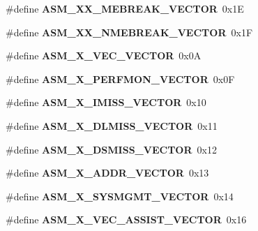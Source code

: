 \begin{DoxyCompactItemize}
\#define {\bfseries A\+S\+M\+\_\+X\+X\+\_\+\+M\+E\+B\+R\+E\+A\+K\+\_\+\+V\+E\+C\+T\+OR}~0x1E
\item 
\mbox{\label{group__ppc__exc_ga9d8d02f899858d8b6e101c22f6008d42}} 
\#define {\bfseries A\+S\+M\+\_\+X\+X\+\_\+\+N\+M\+E\+B\+R\+E\+A\+K\+\_\+\+V\+E\+C\+T\+OR}~0x1F
\item 
\mbox{\label{group__ppc__exc_ga285971eaed22cadd4094161af2421221}} 
\#define {\bfseries A\+S\+M\+\_\+X\+\_\+\+V\+E\+C\+\_\+\+V\+E\+C\+T\+OR}~0x0A
\item 
\mbox{\label{group__ppc__exc_ga71aca8f5d2cb0e7a828c468cc7557fcd}} 
\#define {\bfseries A\+S\+M\+\_\+X\+\_\+\+P\+E\+R\+F\+M\+O\+N\+\_\+\+V\+E\+C\+T\+OR}~0x0F
\item 
\mbox{\label{group__ppc__exc_gae9feb668d329032fccb52764ed84576b}} 
\#define {\bfseries A\+S\+M\+\_\+X\+\_\+\+I\+M\+I\+S\+S\+\_\+\+V\+E\+C\+T\+OR}~0x10
\item 
\mbox{\label{group__ppc__exc_gaddfc70c7ef42a87a448101024aee2331}} 
\#define {\bfseries A\+S\+M\+\_\+X\+\_\+\+D\+L\+M\+I\+S\+S\+\_\+\+V\+E\+C\+T\+OR}~0x11
\item 
\mbox{\label{group__ppc__exc_ga5bc1d7488de872aa883dfabd922cba7d}} 
\#define {\bfseries A\+S\+M\+\_\+X\+\_\+\+D\+S\+M\+I\+S\+S\+\_\+\+V\+E\+C\+T\+OR}~0x12
\item 
\mbox{\label{group__ppc__exc_ga190cf51a9336e64e3cfed7e9a74b9560}} 
\#define {\bfseries A\+S\+M\+\_\+X\+\_\+\+A\+D\+D\+R\+\_\+\+V\+E\+C\+T\+OR}~0x13
\item 
\mbox{\label{group__ppc__exc_gaf6c224ef2eb9ee981ddd4d301861cba3}} 
\#define {\bfseries A\+S\+M\+\_\+X\+\_\+\+S\+Y\+S\+M\+G\+M\+T\+\_\+\+V\+E\+C\+T\+OR}~0x14
\item 
\mbox{\label{group__ppc__exc_ga3d5ab37795de875f80e1aac9180c7b17}} 
\#define {\bfseries A\+S\+M\+\_\+X\+\_\+\+V\+E\+C\+\_\+\+A\+S\+S\+I\+S\+T\+\_\+\+V\+E\+C\+T\+OR}~0x16
\item 
\mbox{\label{group__ppc__exc_gac0e275eebdc517fe12761c71bde513f4}} 

\end{DoxyCompactItemize}
